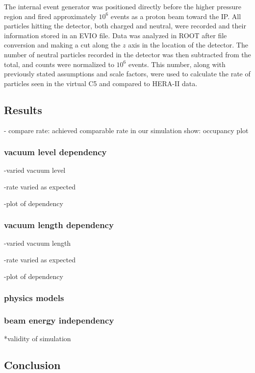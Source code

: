 The internal event generator was positioned directly before the higher pressure region and fired approximately $10^6$ events as a proton beam toward the IP.  All particles hitting the detector, both charged and neutral, were recorded and their information stored in an EVIO file.  Data was analyzed in ROOT after file conversion and making a cut along the $z$ axis in the location of the detector.  The number of neutral particles recorded in the detector was then subtracted from the total, and counts were normalized to $10^6$ events.  This number, along with previously stated assumptions and scale factors, were used to calculate the rate of particles seen in the virtual C5 and compared to HERA-II data.

\subsection{Results}
- compare rate: achieved comparable rate in our simulation
show: occupancy plot

\subsubsection{vacuum level dependency}
-varied vacuum level

-rate varied as expected

-plot of dependency

\subsubsection{vacuum length dependency}
-varied vacuum length

-rate varied as expected

-plot of dependency

\subsubsection{physics models}

\subsubsection{beam energy independency}


*validity of simulation
\subsection{Conclusion}







